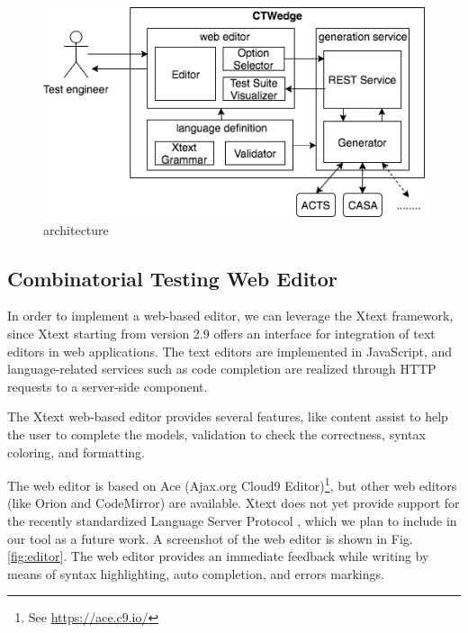 \begin{tikzborder}{\cite{Gargantini16:validation}}
\begin{tikzborder}{\cite{gargantini_combinatorial_2017}}
\begin{tikzborder}{\cite{gargantini_combinatorial_2017}}
\begin{tikzborder}{\cite{garn2019}}
\begin{tikzborder}{\cite{arcaini2019achieving}}
\begin{figure}[bt!]
	\centering
	\includegraphics[width=.8\columnwidth]{images/architecture.png}
	\caption{\ctwedge architecture}\label{fig:architecture}
\end{figure}

\subsection{Combinatorial Testing Web Editor}

\begin{tikzborder}{}
In order to implement a web-based editor, we can leverage the Xtext framework, since Xtext starting from version 2.9 offers an interface for integration of text editors in web applications. The text editors are implemented in JavaScript, and language-related services such as code completion are realized through HTTP requests to a server-side component.

The Xtext web-based editor provides several features, like content assist to help the user to complete the models, validation to check the correctness, syntax coloring, and formatting.

The \ctwedge web editor is based on Ace (Ajax.org Cloud9 Editor)\footnote{See \url{https://ace.c9.io/}}, but other web editors (like Orion and CodeMirror) are available. Xtext does not yet provide support for the recently standardized Language Server Protocol \cite{lsp}, which we plan to include in our tool as a future work.  A screenshot of the \ctwedge web editor is shown in Fig. \ref{fig:editor}. The web editor provides an immediate feedback while writing by means of syntax highlighting, auto completion, and errors markings. 


\end{tikzborder}
\end{tikzborder}
\end{tikzborder}
\end{tikzborder}
\end{tikzborder}
\end{tikzborder}
